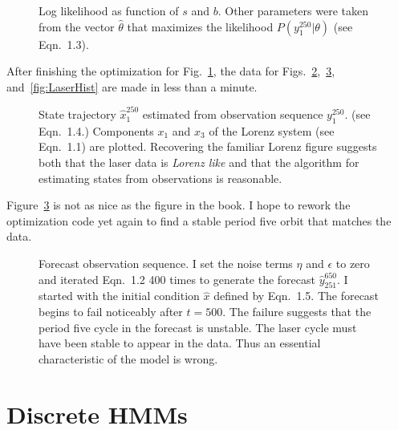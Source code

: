 \documentclass[prelim,showlabels]{book}
\newcommand{\ts}[3]{#1_{#2}^{#3}}                    %
\begin{document}
\begin{figure}[htbp]
  \caption{Log likelihood as function of $s$ and $b$.  Other parameters were
    taken from the vector $\hat \theta$ that maximizes the likelihood
    $P(\ts{y}{1}{250}|\theta)$ (see Eqn.~1.3).}
  \label{fig:LaserLogLike}
\end{figure}

After finishing the optimization for Fig.~\ref{fig:LaserLogLike}, the
data for Figs.~\ref{fig:LaserStates},~\ref{fig:LaserForecast},
and~\ref{fig:LaserHist} are made in less than a minute.
\begin{figure}[htbp]
  \caption[State trajectory $\ts{\hat
    x}{1}{250}$.]%
  {State trajectory $\ts{\hat x}{1}{250}$ estimated from observation
    sequence $\ts{y}{1}{250}$. (see Eqn.~1.4.)
    Components $x_1$ and $x_3$ of the Lorenz system (see
    Eqn.~1.1) are plotted.  Recovering the familiar
    Lorenz figure suggests both that the laser data is \emph{Lorenz
      like} and that the algorithm for estimating states from
    observations is reasonable.}
  \label{fig:LaserStates}
\end{figure}

Figure~\ref{fig:LaserForecast} is not as nice as the figure in the book.
I hope to rework the optimization code yet again to find a stable
period five orbit that matches the data.
\begin{figure}[htbp]
  \caption[Forecast observation sequence.]%
  {Forecast observation sequence.  I set the noise terms $\eta$ and
    $\epsilon$ to zero and iterated Eqn.~1.2 400 times to
    generate the forecast $\ts{\hat y}{251}{650}$.  I started with
    the initial condition $\hat x$ defined by Eqn.~1.5.
    The forecast begins to fail noticeably after $t=500$.  The failure
    suggests that the period five cycle in the forecast is unstable.
    The laser cycle must have been stable to appear in the data.  Thus
    an essential characteristic of the model is wrong.}
  \label{fig:LaserForecast}
\end{figure}

\addtocounter{section}{1}
\section{Discrete HMMs}
\label{sec:intro_hmm}
%
\end{document}
